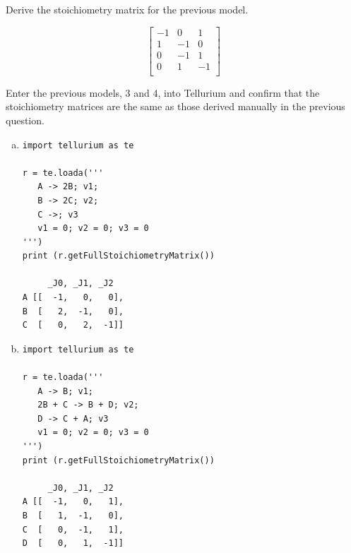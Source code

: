 \documentclass[12pt]{article}
\begin{document}
\begin{question}
Derive the stoichiometry matrix for the previous model.
\end{question}
\begin{solution}
\begin{equation*}
         \left[ \begin{array}{rrrr}
           -1 &  0 &  1  \\
            1 & -1 &  0  \\
            0 & -1 &  1  \\
            0 &  1 & -1  \\
         \end{array} \right]
\end{equation*}
\end{solution}


\begin{question}
Enter the previous models, 3 and 4, into Tellurium and confirm that the stoichiometry matrices are the same as those derived manually in the previous question.
\end{question}
\cprotEnv\begin{solution}
\begin{enumerate}[a)]
\item
\begin{verbatim}
import tellurium as te

r = te.loada('''
   A -> 2B; v1;
   B -> 2C; v2;
   C ->; v3
   v1 = 0; v2 = 0; v3 = 0
''')
print (r.getFullStoichiometryMatrix())

     _J0, _J1, _J2
A [[  -1,   0,   0],
B  [   2,  -1,   0],
C  [   0,   2,  -1]]
\end{verbatim}

\item
\begin{verbatim}
import tellurium as te

r = te.loada('''
   A -> B; v1;
   2B + C -> B + D; v2;
   D -> C + A; v3
   v1 = 0; v2 = 0; v3 = 0
''')
print (r.getFullStoichiometryMatrix())

     _J0, _J1, _J2
A [[  -1,   0,   1],
B  [   1,  -1,   0],
C  [   0,  -1,   1],
D  [   0,   1,  -1]]
\end{verbatim}
\end{enumerate}
\end{solution}
\end{document}
